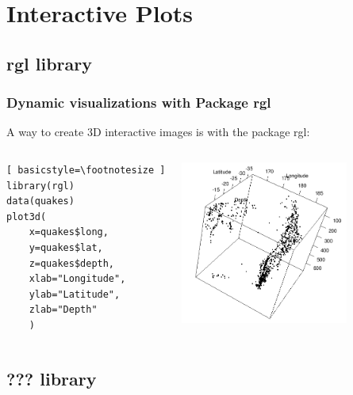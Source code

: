 \section{Interactive Plots}

\subsection{\ttfamily rgl \normalfont library} 
\begin{frame}[fragile]
\frametitle{Dynamic visualizations with Package \ttfamily rgl \normalfont}

A way to create 3D interactive images is with the package \ttfamily rgl: \normalfont 

    \begin{columns}
\begin{lstlisting}[ basicstyle=\footnotesize ]
library(rgl)
data(quakes)
plot3d(
	x=quakes$long, 
	y=quakes$lat, 
	z=quakes$depth, 
	xlab="Longitude", 
	ylab="Latitude", 
	zlab="Depth"
	)
\end{lstlisting}

       \begin{center}
\includegraphics[width = 55mm]{images/Fiji_RGL}
\end{center}
\end{columns}
\end{frame}

\subsection{\ttfamily ??? \normalfont library} 
\begin{frame}[fragile]
	\frametitleDynamic Visualizations with Package \ttfamily ??? \normalfont}
\end{frame}

